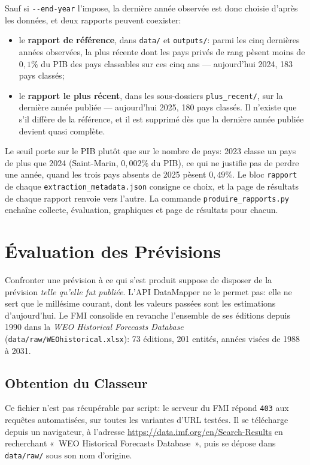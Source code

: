 \documentclass[11pt,a4paper]{article}
\begin{document}
Sauf si \texttt{-{}-end-year} l'impose, la dernière année observée est donc choisie d'après les données, et deux rapports peuvent coexister:
\begin{itemize}
    \item le \textbf{rapport de référence}, dans \texttt{data/} et \texttt{outputs/}: parmi les cinq dernières années observées, la plus récente dont les pays privés de rang pèsent moins de $0{,}1\%$ du PIB des pays classables sur ces cinq ans --- aujourd'hui 2024, 183 pays classés;
    \item le \textbf{rapport le plus récent}, dans les sous-dossiers \texttt{plus\_recent/}, sur la dernière année publiée --- aujourd'hui 2025, 180 pays classés. Il n'existe que s'il diffère de la référence, et il est supprimé dès que la dernière année publiée devient quasi complète.
\end{itemize}

Le seuil porte sur le PIB plutôt que sur le nombre de pays: 2023 classe un pays de plus que 2024 (Saint-Marin, $0{,}002\%$ du PIB), ce qui ne justifie pas de perdre une année, quand les trois pays absents de 2025 pèsent $0{,}49\%$. Le bloc \texttt{rapport} de chaque \texttt{extraction\_metadata.json} consigne ce choix, et la page de résultats de chaque rapport renvoie vers l'autre. La commande \texttt{produire\_rapports.py} enchaîne collecte, évaluation, graphiques et page de résultats pour chacun.

\section{Évaluation des Prévisions}

Confronter une prévision à ce qui s'est produit suppose de disposer de la prévision \emph{telle qu'elle fut publiée}. L'API DataMapper ne le permet pas: elle ne sert que le millésime courant, dont les valeurs passées sont les estimations d'aujourd'hui. Le FMI consolide en revanche l'ensemble de ses éditions depuis 1990 dans la \textit{WEO Historical Forecasts Database} (\texttt{data/raw/WEOhistorical.xlsx}): 73 éditions, 201 entités, années visées de 1988 à 2031.

\subsection{Obtention du Classeur}
Ce fichier n'est pas récupérable par script: le serveur du FMI répond \texttt{403} aux requêtes automatisées, sur toutes les variantes d'URL testées. Il se télécharge depuis un navigateur, à l'adresse \url{https://data.imf.org/en/Search-Results} en recherchant «~WEO Historical Forecasts Database~», puis se dépose dans \texttt{data/raw/} sous son nom d'origine.
\end{document}

